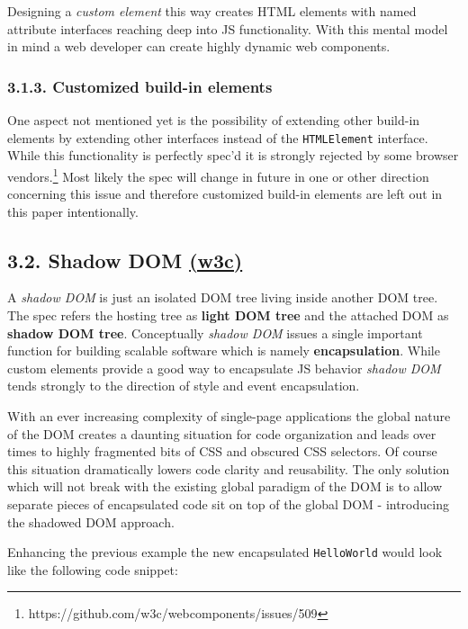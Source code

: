 \documentclass[]{article}
\begin{document}
Designing a \emph{custom element} this way creates HTML elements with
named attribute interfaces reaching deep into JS functionality. With
this mental model in mind a web developer can create highly dynamic web
components.

\subsubsection{3.1.3. Customized build-in
elements}\label{customized-build-in-elements}

One aspect not mentioned yet is the possibility of extending other
build-in elements by extending other interfaces instead of the
\texttt{HTMLElement} interface. While this functionality is perfectly
spec'd it is strongly rejected by some browser vendors.\footnote{https://github.com/w3c/webcomponents/issues/509}
Most likely the spec will change in future in one or other direction
concerning this issue and therefore customized build-in elements are
left out in this paper intentionally.

\subsection{\texorpdfstring{3.2. Shadow DOM
\href{http://w3c.github.io/webcomponents/spec/shadow/}{(w3c)}}{3.2. Shadow DOM (w3c)}}\label{shadow-dom-w3c}

A \emph{shadow DOM} is just an isolated DOM tree living inside another
DOM tree. The spec refers the hosting tree as \textbf{light DOM tree}
and the attached DOM as \textbf{shadow DOM tree}. Conceptually
\emph{shadow DOM} issues a single important function for building
scalable software which is namely \textbf{encapsulation}. While custom
elements provide a good way to encapsulate JS behavior \emph{shadow DOM}
tends strongly to the direction of style and event encapsulation.

With an ever increasing complexity of single-page applications the
global nature of the DOM creates a daunting situation for code
organization and leads over times to highly fragmented bits of CSS and
obscured CSS selectors. Of course this situation dramatically lowers
code clarity and reusability. The only solution which will not break
with the existing global paradigm of the DOM is to allow separate pieces
of encapsulated code sit on top of the global DOM - introducing the
shadowed DOM approach.

Enhancing the previous example the new encapsulated \texttt{HelloWorld}
would look like the following code snippet:
\end{document}
